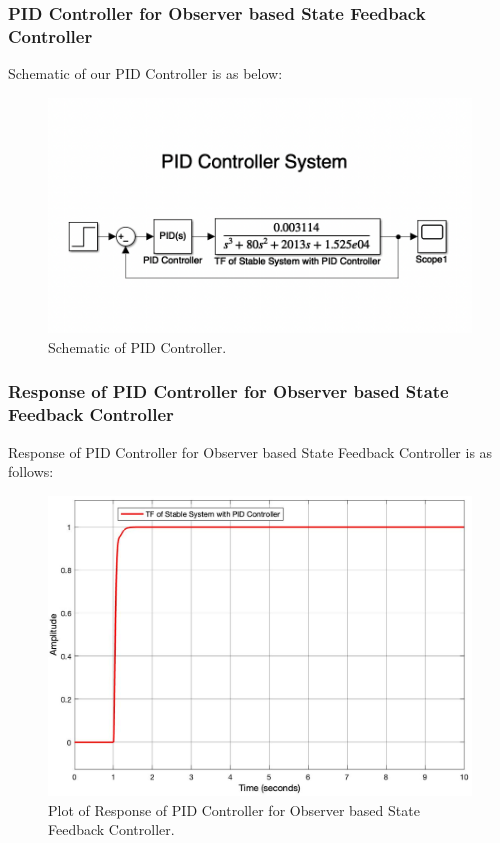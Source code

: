 \documentclass{article}
\begin{document}
\subsubsection{PID Controller for Observer based State Feedback Controller}
Schematic of our PID Controller is as below:

\begin{figure}[h!]
\centering
\includegraphics[scale=0.6]{PID_Model.png}
\caption{Schematic of  PID Controller.}
\end{figure}
\vskip30pt

\subsubsection{Response of PID Controller for Observer based State Feedback Controller}
Response of PID Controller for Observer based State Feedback Controller is as follows: 
\begin{figure}[h!]
\centering
\includegraphics[scale=0.25]{pid_response.jpg}
\caption{Plot of Response of PID Controller for Observer based State Feedback Controller.}
\end{figure}
\vskip10pt
\end{document}
